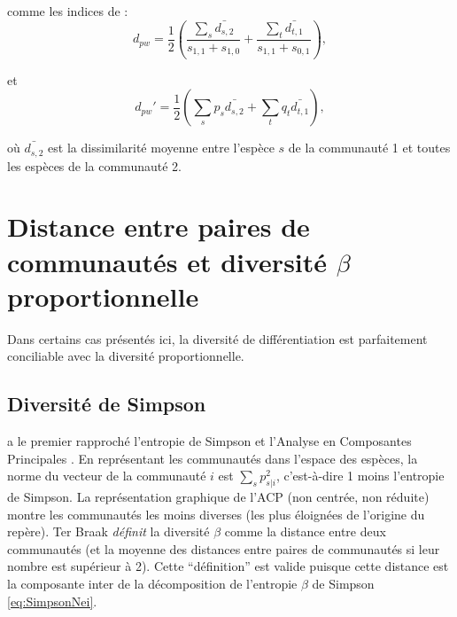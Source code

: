 \documentclass[
  11pt,
  french,
  a4paper,
  extrafontsizes,onecolumn,openright
  ]{memoir}
\newlength{\rf}
\begin{document}
comme les indices de \textcite{Swenson2011}:
\begin{equation}
  \label{eq:Swenson2011a}
  d_{\mathit{pw}} = \frac{1}{2}\left( \frac{\sum_s{\bar{d_{s,2}}}}{s_{1,1}+s_{1,0}} + \frac{\sum_t{\bar{d_{t,1}}}}{s_{1,1}+s_{0,1}} \right),
\end{equation}

et
\begin{equation}
  \label{eq:Swenson2011b}
  d_{\mathit{pw}}' = \frac{1}{2}\left( \sum_s{p_s\bar{d_{s,2}}} + \sum_t{q_t\bar{d_{t,1}}} \right), 
\end{equation}

où \(\bar{d_{s,2}}\) est la dissimilarité moyenne entre l'espèce \(s\) de la communauté 1 et toutes les espèces de la communauté 2.

\hypertarget{distance-entre-paires-de-communautuxe9s-et-diversituxe9-beta-proportionnelle}{%
\section{\texorpdfstring{Distance entre paires de communautés et diversité \(\beta\) proportionnelle}{Distance entre paires de communautés et diversité \textbackslash beta proportionnelle}}\label{distance-entre-paires-de-communautuxe9s-et-diversituxe9-beta-proportionnelle}}

Dans certains cas présentés ici, la diversité de différentiation est parfaitement conciliable avec la diversité proportionnelle.

\hypertarget{diversituxe9-de-simpson}{%
\subsection{Diversité de Simpson}\label{diversituxe9-de-simpson}}

\textcite{terBraak1983} a le premier rapproché l'entropie de Simpson et l'Analyse en Composantes Principales \autocite{Pearson1901}.
En représentant les communautés dans l'espace des espèces, la norme du vecteur de la communauté \(i\) est \({\sum_s{p_{s|i}^2}}\), c'est-à-dire 1 moins l'entropie de Simpson.
La représentation graphique de l'ACP (non centrée, non réduite) montre les communautés les moins diverses (les plus éloignées de l'origine du repère).
Ter Braak \emph{définit} la diversité \(\beta\) comme la distance entre deux communautés (et la moyenne des distances entre paires de communautés si leur nombre est supérieur à 2).
Cette \enquote{définition} est valide puisque cette distance est la composante inter de la décomposition de l'entropie \(\beta\) de Simpson \eqref{eq:SimpsonNei}.
\end{document}

